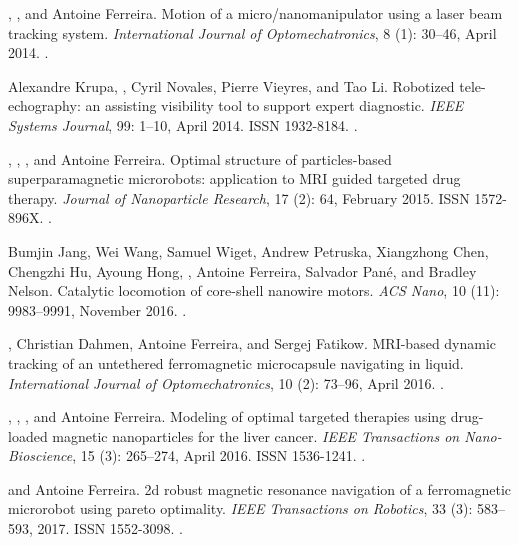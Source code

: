\begin{Mybibliography}{99}
  \NAmari, \DavidFolio, and Antoine Ferreira.
  \newblock Motion of a micro/nanomanipulator using a laser beam tracking system.
  \newblock \emph{International Journal of Optomechatronics}, 8
  (1): 30--46, April 2014{}.
  \newblock {}.
    
  Alexandre Krupa, \DavidFolio, Cyril Novales, Pierre Vieyres, and Tao Li.
  \newblock Robotized tele-echography: an assisting visibility tool to support
  expert diagnostic.
  \newblock \emph{IEEE Systems Journal}, 99: 1--10, April 2014.
  \newblock ISSN 1932-8184.
  \newblock {}.
    
  \LMellal, \KBelharet, \DavidFolio, and Antoine Ferreira.
  \newblock Optimal structure of particles-based superparamagnetic microrobots:
  application to MRI guided targeted drug therapy.
  \newblock \emph{Journal of Nanoparticle Research}, 17 (2):
  64, February 2015{}.
  \newblock ISSN 1572-896X.
  \newblock {}.

  Bumjin Jang, Wei Wang, Samuel Wiget, Andrew Petruska, Xiangzhong Chen, Chengzhi
  Hu, Ayoung Hong, \DavidFolio, Antoine Ferreira, Salvador Pané, and Bradley
  Nelson.
  \newblock Catalytic locomotion of core-shell nanowire motors.
  \newblock \emph{ACS Nano}, 10 (11): 9983--9991, November
  2016.
  \newblock {}.

  \DavidFolio, Christian Dahmen, Antoine Ferreira, and Sergej Fatikow.
  \newblock MRI-based dynamic tracking of an untethered ferromagnetic
  microcapsule navigating in liquid.
  \newblock \emph{International Journal of Optomechatronics}, 10
  (2): 73--96, April 2016.
  \newblock {}.
  
  \LMellal, \DavidFolio, \KBelharet, and Antoine Ferreira.
  \newblock Modeling of optimal targeted therapies using drug-loaded magnetic
  nanoparticles for the liver cancer.
  \newblock \emph{IEEE Transactions on Nano-Bioscience}, 15
  (3): 265--274, April 2016{}.
  \newblock ISSN 1536-1241.
  \newblock {}.
  
  \DavidFolio and Antoine Ferreira.
  \newblock 2d robust magnetic resonance navigation of a ferromagnetic microrobot
  using pareto optimality.
  \newblock \emph{{IEEE} Transactions on Robotics}, 33 (3):
  583--593, 2017.
  \newblock ISSN 1552-3098.
  \newblock {}.

  
\end{Mybibliography}



